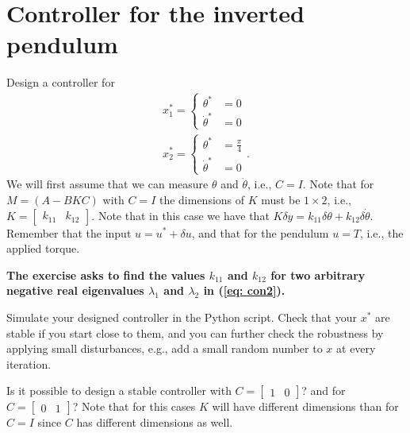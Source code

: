 \section{Controller for the inverted pendulum}
Design a controller for
\begin{align}
	x_1^* = \begin{cases}\theta^* &= 0 \\ \dot\theta^*&= 0 \end{cases} \nonumber \\
		x_2^* = \begin{cases}\theta^* &= \frac{\pi}{4} \\ \dot\theta^*&= 0 \end{cases}. \nonumber
\end{align}
We will first assume that we can measure $\theta$ and $\dot\theta$, i.e., $C = I$. Note that for $M = (A - BKC)$ with $C = I$ the dimensions of $K$ must be $1 \times 2$, i.e., $K = \begin{bmatrix}k_{11} & k_{12} \end{bmatrix}$. Note that in this case we have that $K\delta y = k_{11}\delta\theta + k_{12}\delta\dot\theta$. Remember that the input $u = u^* + \delta u$, and that for the pendulum $u = T$, i.e., the applied torque.

\textbf{The exercise asks to find the values $k_{11}$ and $k_{12}$ for two arbitrary negative real eigenvalues $\lambda_1$ and $\lambda_2$ in (\ref{eq: con2}).}

Simulate your designed controller in the Python script. Check that your $x^*$ are stable if you start close to them, and you can further check the robustness by applying small disturbances, e.g., add a small random number to $x$ at every iteration.

Is it possible to design a stable controller with $C = \begin{bmatrix}1 & 0\end{bmatrix}$? and for $C = \begin{bmatrix}0 & 1\end{bmatrix}$? Note that for this cases $K$ will have different dimensions than for $C = I$ since $C$ has different dimensions as well.



